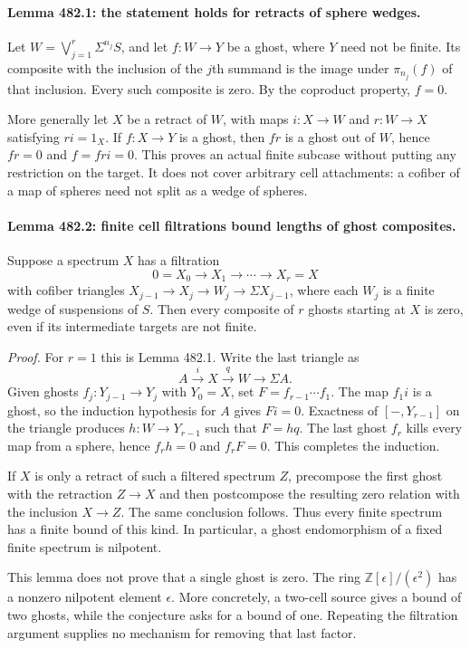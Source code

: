 \documentclass[11pt]{article}
\begin{document}
\paragraph{Lemma 482.1: the statement holds for retracts of sphere wedges.}
Let $W=\bigvee_{j=1}^r\Sigma^{n_j}S$, and let $f:W\to Y$ be a ghost,
where $Y$ need not be finite. Its composite with the inclusion of the
$j$th summand is the image under $\pi_{n_j}(f)$ of that inclusion.
Every such composite is zero. By the coproduct property, $f=0$.

More generally let $X$ be a retract of $W$, with maps $i:X\to W$ and
$r:W\to X$ satisfying $ri=1_X$. If $f:X\to Y$ is a ghost, then $fr$
is a ghost out of $W$, hence $fr=0$ and $f=fri=0$. This proves an
actual finite subcase without putting any restriction on the target.
It does not cover arbitrary cell attachments: a cofiber of a map of
spheres need not split as a wedge of spheres.

\paragraph{Lemma 482.2: finite cell filtrations bound lengths of ghost composites.}
Suppose a spectrum $X$ has a filtration
\[
 0=X_0\longrightarrow X_1\longrightarrow\cdots\longrightarrow X_r=X
\]
with cofiber triangles $X_{j-1}\to X_j\to W_j\to\Sigma X_{j-1}$,
where each $W_j$ is a finite wedge of suspensions of $S$. Then every
composite of $r$ ghosts starting at $X$ is zero, even if its intermediate
targets are not finite.

\emph{Proof.} For $r=1$ this is Lemma 482.1. Write the last triangle as
\[
             A\xrightarrow{i}X\xrightarrow{q}W\longrightarrow\Sigma A.
\]
Given ghosts $f_j:Y_{j-1}\to Y_j$ with $Y_0=X$, set
$F=f_{r-1}\cdots f_1$. The map $f_1i$ is a ghost, so the induction
hypothesis for $A$ gives $Fi=0$. Exactness of $[-,Y_{r-1}]$ on the
triangle produces $h:W\to Y_{r-1}$ such that $F=hq$. The last ghost
$f_r$ kills every map from a sphere, hence $f_rh=0$ and $f_rF=0$.
This completes the induction.

If $X$ is only a retract of such a filtered spectrum $Z$, precompose the
first ghost with the retraction $Z\to X$ and then postcompose the resulting
zero relation with the inclusion $X\to Z$. The same conclusion follows.
Thus every finite spectrum has a finite bound of this kind. In
particular, a ghost endomorphism of a fixed finite spectrum is nilpotent.

This lemma does not prove that a single ghost is zero. The ring
$\mathbb Z[\epsilon]/(\epsilon^2)$ has a nonzero nilpotent element
$\epsilon$. More concretely, a two-cell source gives a bound of two
ghosts, while the conjecture asks for a bound of one. Repeating the
filtration argument supplies no mechanism for removing that last factor.
\end{document}
